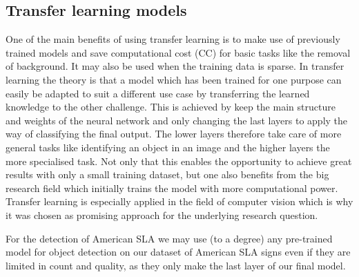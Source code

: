 \subsection{Transfer learning models}
One of the main benefits of using transfer learning is to make use of previously trained models and save computational cost (CC) for basic tasks like the removal of background. It may also be used when the training data is sparse. In transfer learning the theory is that a model which has been trained for one purpose can easily be adapted to suit a different use case by transferring the learned knowledge to the other challenge\cite{zhuang2020comprehensive}. This is achieved by keep the main structure and weights of the neural network and only changing the last layers to apply the way of classifying the final output. The lower layers therefore take care of more general tasks like identifying an object in an image\cite{neyshabur2021transferred} and the higher layers the more specialised task. Not only that this enables the opportunity to achieve great results with only a small training dataset, but one also benefits from the big research field which initially trains the model with more computational power. Transfer learning is especially applied in the field of computer vision which is why it was chosen as promising approach for the underlying research question.

For the detection of American SLA we may use (to a degree) any pre-trained model for object detection on our dataset of American SLA signs even if they are limited in count and quality, as they only make the last layer of our final model.

